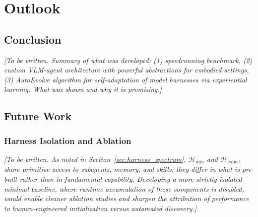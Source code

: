 
\newpage
\section{Outlook}\label{sec:outlook}

\subsection{Conclusion}\label{sec:conclusion}

\textit{[To be written. Summary of what was developed: (1) speedrunning benchmark, (2) custom VLM-agent architecture with powerful abstractions for embodied settings, (3) AutoEvolve algorithm for self-adaptation of model harnesses via experiential learning. What was shown and why it is promising.]}

\subsection{Future Work}\label{sec:future_work}


\subsubsection{Harness Isolation and Ablation}\label{sec:harness_isolation}

\textit{[To be written. As noted in Section~\ref{sec:harness_spectrum}, $\mathcal{H}_{\min}$ and $\mathcal{H}_{\text{expert}}$ share primitive access to subagents, memory, and skills; they differ in what is pre-built rather than in fundamental capability. Developing a more strictly isolated minimal baseline, where runtime accumulation of these components is disabled, would enable cleaner ablation studies and sharpen the attribution of performance to human-engineered initialization versus automated discovery.]}

